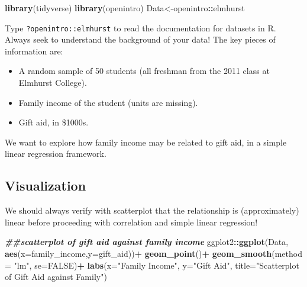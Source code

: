 \documentclass[
]{book}
\newenvironment{Shaded}{\begin{snugshade}}{\end{snugshade}}
\newcommand{\AttributeTok}[1]{\textcolor[rgb]{0.13,0.29,0.53}{#1}}
\newcommand{\ConstantTok}[1]{\textcolor[rgb]{0.56,0.35,0.01}{#1}}
\newcommand{\DocumentationTok}[1]{\textcolor[rgb]{0.56,0.35,0.01}{\textbf{\textit{#1}}}}
\newcommand{\FunctionTok}[1]{\textcolor[rgb]{0.13,0.29,0.53}{\textbf{#1}}}
\newcommand{\NormalTok}[1]{#1}
\newcommand{\OtherTok}[1]{\textcolor[rgb]{0.56,0.35,0.01}{#1}}
\newcommand{\SpecialCharTok}[1]{\textcolor[rgb]{0.81,0.36,0.00}{\textbf{#1}}}
\newcommand{\StringTok}[1]{\textcolor[rgb]{0.31,0.60,0.02}{#1}}
\providecommand{\tightlist}{%
  \setlength{\itemsep}{0pt}\setlength{\parskip}{0pt}}
\begin{document}
\begin{Shaded}
\begin{Highlighting}[]
\FunctionTok{library}\NormalTok{(tidyverse)}
\FunctionTok{library}\NormalTok{(openintro)}
\NormalTok{Data}\OtherTok{\textless{}{-}}\NormalTok{openintro}\SpecialCharTok{::}\NormalTok{elmhurst}
\end{Highlighting}
\end{Shaded}

Type \texttt{?openintro::elmhurst} to read the documentation for datasets in R. Always seek to understand the background of your data! The key pieces of information are:

\begin{itemize}
\tightlist
\item
  A random sample of 50 students (all freshman from the 2011 class at Elmhurst College).
\item
  Family income of the student (units are missing).
\item
  Gift aid, in \$1000s.
\end{itemize}

We want to explore how family income may be related to gift aid, in a simple linear regression framework.

\hypertarget{visualization}{%
\subsection*{Visualization}\label{visualization}}

We should always verify with scatterplot that the relationship is (approximately) linear before proceeding with correlation and simple linear regression!

\begin{Shaded}
\begin{Highlighting}[]
\DocumentationTok{\#\#scatterplot of gift aid against family income}
\NormalTok{ggplot2}\SpecialCharTok{::}\FunctionTok{ggplot}\NormalTok{(Data, }\FunctionTok{aes}\NormalTok{(}\AttributeTok{x=}\NormalTok{family\_income,}\AttributeTok{y=}\NormalTok{gift\_aid))}\SpecialCharTok{+}
  \FunctionTok{geom\_point}\NormalTok{()}\SpecialCharTok{+}
  \FunctionTok{geom\_smooth}\NormalTok{(}\AttributeTok{method =} \StringTok{"lm"}\NormalTok{, }\AttributeTok{se=}\ConstantTok{FALSE}\NormalTok{)}\SpecialCharTok{+}
  \FunctionTok{labs}\NormalTok{(}\AttributeTok{x=}\StringTok{"Family Income"}\NormalTok{, }\AttributeTok{y=}\StringTok{"Gift Aid"}\NormalTok{, }\AttributeTok{title=}\StringTok{"Scatterplot of Gift Aid against Family"}\NormalTok{)}
\end{Highlighting}
\end{Shaded}
\end{document}
